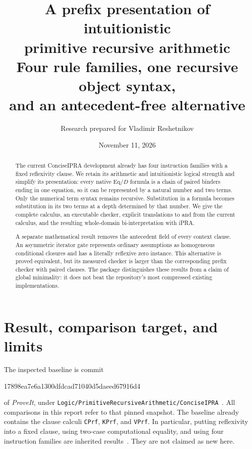 \documentclass[11pt]{article}
\title{A prefix presentation of intuitionistic\protect\\ primitive recursive arithmetic\large\protect\\ Four rule families, one recursive object syntax,\protect\\ and an antecedent-free alternative}
\author{Research prepared for Vladimir Reshetnikov}
\date{November 11, 2026}
\theoremstyle{definition}\newtheorem{definition}[theorem]{Definition}
\theoremstyle{remark}\newtheorem{remark}[theorem]{Remark}
\newcommand{\code}[1]{\texttt{#1}}
\begin{document}
\maketitle
\begin{abstract}
The current ConciseIPRA development already has four instruction families
with a fixed reflexivity clause. We retain its arithmetic and intuitionistic
logical strength and simplify its presentation: every native Eq/$D$ formula
is a chain of paired binders ending in one equation, so it can be represented
by a natural number and two terms. Only the numerical term syntax remains
recursive. Substitution in a formula becomes substitution in its two terms
at a depth determined by that number. We give the complete calculus, an
executable checker, explicit translations to and from the current calculus,
and the resulting whole-domain bi-interpretation with iPRA.

A separate mathematical result removes the antecedent field of every
context clause. An asymmetric iterator gate represents ordinary assumptions
as homogeneous conditional closures and has a literally reflexive zero
instance. This alternative is proved equivalent, but its measured checker
is larger than the corresponding prefix checker with paired clauses.
The package distinguishes these results from a claim of global minimality:
it does not beat the repository's most compressed existing implementations.
\end{abstract}

\section{Result, comparison target, and limits}

The inspected baseline is commit
\begin{center}\small\ttfamily
17898ea7e6a1300dfdcad71040d5daeed67916d4
\end{center}
of \emph{ProveIt}, under
\code{Logic/PrimitiveRecursiveArithmetic/ConciseIPRA}~\cite{repo}.
All comparisons in this report refer to that pinned snapshot.
The baseline already contains the clause calculi \code{CPrf}, \code{KPrf},
and \code{VPrf}. In particular, putting reflexivity into a fixed clause,
using two-case computational equality, and using four instruction families
are inherited results~\cite{clausal,uniform,eval}. They are not claimed as
new here.
\end{document}
